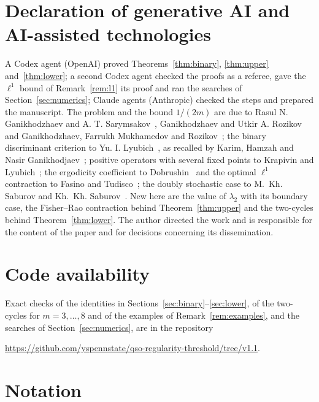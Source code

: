 \documentclass[11pt]{amsart}
\theoremstyle{definition}
\theoremstyle{remark}
\begin{document}
\section*{Declaration of generative AI and AI-assisted technologies}
A Codex agent (OpenAI) proved Theorems~\ref{thm:binary}, \ref{thm:upper} and~\ref{thm:lower}; a second Codex agent
checked the proofs as a referee, gave the $\ell^1$ bound of Remark~\ref{rem:l1} its proof and ran the searches of
Section~\ref{sec:numerics}; Claude agents (Anthropic) checked the steps and prepared the manuscript. The problem and the bound $1/(2m)$ are due
to Rasul N. Ganikhodzhaev and A. T. Sarymsakov~\cite{GS88}, Ganikhodzhaev and Utkir A. Rozikov~\cite{GR09} and
Ganikhodzhaev, Farrukh Mukhamedov and Rozikov~\cite{GMR11}; the binary discriminant criterion to Yu. I.
Lyubich~\cite{Lyubich74}, as recalled by Karim, Hamzah and Nasir Ganikhodjaev~\cite{KHG22}; positive operators with
several fixed points to Krapivin and Lyubich~\cite{KL76}; the ergodicity coefficient to Dobrushin~\cite{Dobrushin56} and
the optimal $\ell^1$ contraction to Fasino and Tudisco~\cite{FT20}; the doubly stochastic case to M.~Kh. Saburov and
Kh.~Kh. Saburov~\cite{SS25}. New here are the value of $\lambda_2$ with its boundary case, the Fisher--Rao contraction
behind Theorem~\ref{thm:upper} and the two-cycles behind Theorem~\ref{thm:lower}. The author directed
the work and is responsible for the content of the paper and for decisions concerning its dissemination.

\section*{Code availability}
Exact checks of the identities in Sections~\ref{sec:binary}--\ref{sec:lower}, of the two-cycles for $m=3,\dots,8$ and of
the examples of Remark~\ref{rem:examples}, and the searches of Section~\ref{sec:numerics}, are in the repository
\begin{center}\url{https://github.com/yspennstate/qso-regularity-threshold/tree/v1.1}.\end{center}

\appendix
\section{Notation}\label{app:notation}
\end{document}

